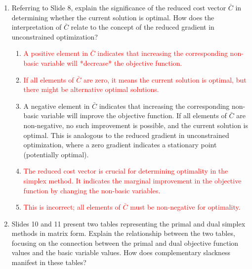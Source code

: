 \documentclass{article}%
\newcommand{\incorrect}[1]{\textcolor{red}{#1}}
\begin{document}
\begin{enumerate}
\begin{enumerate}
\begin{enumerate}
\item \incorrect{This solution violates the constraints.  The values of $x_1$ and $x_2$ are not feasible.}%
\item \incorrect{The initial basic feasible solution is directly obtained by setting the non-basic variables to zero and solving for the basic variables.}%
\item \incorrect{This is a feasible solution, but it is not the initial basic feasible solution. This solution is reached after several iterations of the simplex method.}%
\item \incorrect{This is a feasible solution, but it is not the initial basic feasible solution. This solution is reached after several iterations of the simplex method.}%
\end{enumerate}%
\vspace{0.5em}%
\item Referring to Slide 8, explain the significance of the reduced cost vector $\bar{C}$ in determining whether the current solution is optimal.  How does the interpretation of $\bar{C}$ relate to the concept of the reduced gradient in unconstrained optimization?%
\begin{enumerate}%
\item \incorrect{A positive element in $\bar{C}$ indicates that increasing the corresponding non-basic variable will *decrease* the objective function.}%
\item \incorrect{If all elements of $\bar{C}$ are zero, it means the current solution is optimal, but there might be alternative optimal solutions.}%
\item A negative element in $\bar{C}$ indicates that increasing the corresponding non-basic variable will improve the objective function.  If all elements of $\bar{C}$ are non-negative, no such improvement is possible, and the current solution is optimal. This is analogous to the reduced gradient in unconstrained optimization, where a zero gradient indicates a stationary point (potentially optimal).%
\item \incorrect{The reduced cost vector is crucial for determining optimality in the simplex method. It indicates the marginal improvement in the objective function by changing the non-basic variables.}%
\item \incorrect{This is incorrect; all elements of $\bar{C}$ must be non-negative for optimality.}%
\end{enumerate}%
\vspace{0.5em}%
\item Slides 10 and 11 present two tables representing the primal and dual simplex methods in matrix form. Explain the relationship between the two tables, focusing on the connection between the primal and dual objective function values and the basic variable values.  How does complementary slackness manifest in these tables?%

\end{enumerate}
\end{enumerate}
\end{document}
